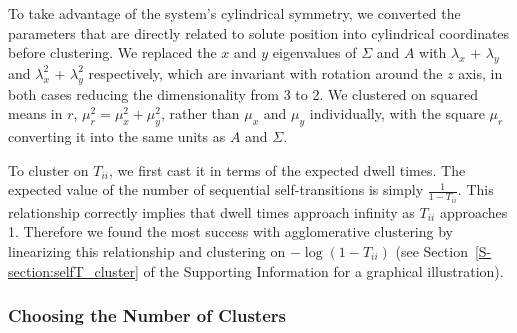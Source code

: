 \documentclass[journal=jpcbfk,manuscript=article]{achemso}
\begin{document}
  To take advantage of the system's cylindrical symmetry, we converted the parameters that
  are directly related to solute position into cylindrical coordinates before clustering. 
  We replaced the $x$ and $y$ eigenvalues of $\Sigma$ and $A$ with
  $\lambda_x$ + $\lambda_y$ and $\lambda_x^2$ + $\lambda_y^2$
  respectively, which are invariant with rotation around the $z$ axis,
  in both cases reducing the dimensionality from 3 to 2.  We clustered
  on squared means in $r$, $\mu_r^2 = \mu_x^2 + \mu_y^2$, rather than
  $\mu_x$ and $\mu_y$ individually, with the square $\mu_r$ converting
  it into the same units as $A$ and $\Sigma$.

  To cluster on $T_{ii}$, we first cast it in terms of the expected dwell times. The expected
  value of the number of sequential self-transitions is simply $\frac{1}{1 - T_{ii}}$. This 
  relationship correctly implies that dwell times approach infinity as $T_{ii}$ approaches
  1. Therefore we found the most success with agglomerative clustering by linearizing this
  relationship and clustering on $-\log(1 - T_{ii})$ (see Section~\ref{S-section:selfT_cluster}
  of the Supporting Information for a graphical illustration).
  
%   
 
  \subsubsection*{Choosing the Number of Clusters}
\end{document}
